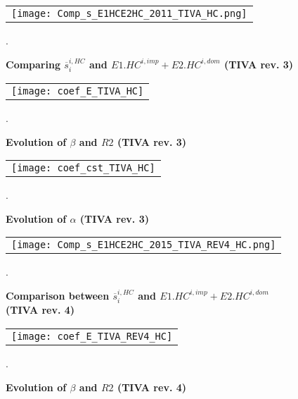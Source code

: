 \documentclass[11pt,a4paper]{article}
\begin{document}
\begin{appendices}
\begin{figure}[!h]
	\centering
	\caption{\footnotesize{\textbf{Comparing $\overline{s}_{i}^{i,HC}$ and $E1.HC^{i,imp}+E2.HC^{i,dom}$ (TIVA rev. 3)}}}
	\begin{tabular}{c}
		\texttt{[image: Comp\_s\_E1HCE2HC\_2011\_TIVA\_HC.png]}\\
	\end{tabular}
	\label{fig:ratiodir_TiVA}
	.
\end{figure}

\begin{figure}[!h]
	\centering
	\caption{\footnotesize{\textbf{Evolution of $\beta$ and $R2$ (TIVA rev. 3)}}}
	\begin{tabular}{c}
		\texttt{[image: coef\_E\_TIVA\_HC]}\\
	\end{tabular}
	\label{fig:evolution_b_TiVA}
	.
\end{figure}

\begin{figure}[!h]
	\centering
	\caption{\footnotesize{\textbf{Evolution of $\alpha$ (TIVA rev. 3)}}}
	\begin{tabular}{c}
		\texttt{[image: coef\_cst\_TIVA\_HC]}\\
	\end{tabular}
	\label{fig:evolution_cst_TiVA}
	.
\end{figure}

\begin{figure}[!h]
	\centering
	\caption{\footnotesize{\textbf{Comparison between $\overline{s}_{i}^{i,HC}$ and $E1.HC^{i,imp}+E2.HC^{i,dom}$ (TIVA rev. 4)}}}
	\begin{tabular}{c}
		\texttt{[image: Comp\_s\_E1HCE2HC\_2015\_TIVA\_REV4\_HC.png]}\\
	\end{tabular}
	\label{fig:ratiodir_TiVA_REV4}
	.
\end{figure}

\begin{figure}[!h]
	\centering
	\caption{\footnotesize{\textbf{Evolution of $\beta$ and $R2$ (TIVA rev. 4)}}}
	\begin{tabular}{c}
		\texttt{[image: coef\_E\_TIVA\_REV4\_HC]}\\
	\end{tabular}
	\label{fig:evolution_b_TiVA_REV4}
	.
\end{figure}


\end{appendices}
\end{document}
